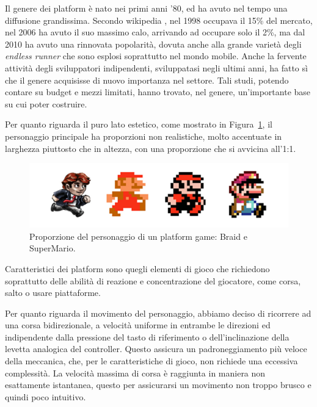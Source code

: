 Il genere dei platform è nato nei primi anni ’80, ed ha avuto nel tempo una diffusione grandissima. Secondo wikipedia \cite{platform_wikipedia} , nel 1998 occupava il 15\% del mercato, nel 2006 ha avuto il suo massimo calo, arrivando ad occupare solo il 2\%, ma dal 2010 ha avuto una rinnovata popolarità, dovuta anche alla grande varietà degli \textit{endless runner} che sono esplosi soprattutto nel mondo mobile. Anche la fervente attività degli sviluppatori indipendenti, sviluppatasi negli ultimi anni, ha fatto sì che il genere acquisisse di nuovo importanza nel settore. Tali studi, potendo contare su budget e mezzi limitati, hanno trovato, nel genere, un’importante base su cui poter costruire.

Per quanto riguarda il puro lato estetico, come mostrato in Figura~\ref{fig:platform_proportions}, il personaggio principale ha proporzioni non realistiche, molto accentuate in larghezza piuttosto che in altezza, con una proporzione che si avvicina all'1:1.

\begin{figure}%
	\centering
	\includegraphics[width= 0.9\columnwidth]{images/gameDesign/02_braid_SM.jpg}
	\caption{Proporzione del personaggio di un platform game: Braid e SuperMario.}
	\label{fig:platform_proportions}
\end{figure}

Caratteristici dei platform sono quegli elementi di gioco che richiedono soprattutto delle abilità di reazione e concentrazione del giocatore, come corsa, salto o usare piattaforme.

Per quanto riguarda il movimento del personaggio, abbiamo deciso di ricorrere ad una corsa bidirezionale, a velocità uniforme in entrambe le direzioni ed indipendente dalla pressione del tasto di riferimento o dell’inclinazione della levetta analogica del controller. Questo assicura un padroneggiamento più veloce della meccanica, che, per le caratteristiche di gioco, non richiede una eccessiva complessità.
La velocità massima di corsa è raggiunta in maniera non esattamente istantanea, questo per assicurarsi un movimento non troppo brusco e quindi poco intuitivo.

